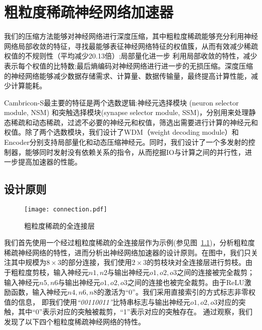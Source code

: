 \chapter{粗粒度稀疏神经网络加速器}

我们的压缩方法能够对神经网络进行深度压缩，其中粗粒度稀疏能够充分利用神经网络局部收敛的特征，寻找最能够表征神经网络特征的权值簇，从而有效减少稀疏权值的不规则性（平均减少20.13倍）;局部量化进一步
利用局部收敛的特性，减少表示每个权值的比特数;最后熵编码对神经网络进行进一步的无损压缩。深度压缩的神经网络能够减少数据存储需求、计算量、数据传输量，最终提高计算性能，减少计算能耗。

 Cambricon-S最主要的特征是两个选数逻辑:神经元选择模块 (neuron selector module, NSM) 和突触选择模块(synapse selector module, SSM)，分别用来处理静态稀疏和动态稀疏，过滤不必要的神经元和权值，筛选出需要进行计算的神经元和权值。除了两个选数模块，我们设计了WDM（weight decoding module）和Encoder分别支持局部量化和动态压缩神经元。同时，我们设计了一个多发射的控制器，能够同时发射没有依赖关系的指令，从而挖掘IO与计算之间的并行性，进一步提高加速器的性能。



\section{设计原则}
\label{sec:principle}

\begin{figure}[ht]
\centering
\texttt{[image: connection.pdf]}
\caption{粗粒度稀疏的全连接层}
\label{fig:connection}
\end{figure}

我们首先使用一个经过粗粒度稀疏的全连接层作为示例(参见图~\ref{fig:connection})，分析粗粒度稀疏神经网络的特性，进而分析出神经网络加速器的设计原则。在图中，我们只关注其中规模为$8\times 3$的部分连接，我们使用$2\times 3$的剪枝块对全连接层进行剪枝。由于粗粒度剪枝，输入神经元$n1, n2$与输出神经元$o1, o2, o3$之间的连接被完全裁剪；输入神经元$n5, n6$与输出神经元$o1, o2, o3$之间的连接也被完全裁剪。由于ReLU激励函数，输入神经元$n4, n6, n8$的激活为“0”。我们采用直接索引的方式标志非零权值的信息，
即我们使用\emph{“00110011”}比特串标志与输出神经元$o1, o2, o3$对应的突触，其中“0”表示对应的突触被裁剪，“1”表示对应的突触存在。
通过观察，我们发现了以下四个粗粒度稀疏神经网络的特性。

